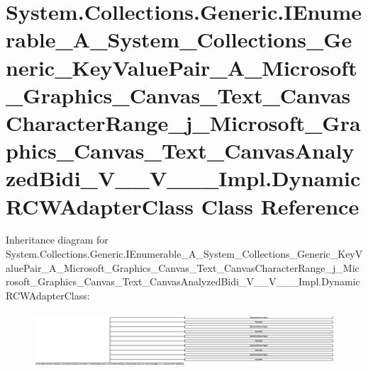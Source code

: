 \hypertarget{class_system_1_1_collections_1_1_generic_1_1_i_enumerable___a___system___collections___generic__0604c343bfe8698948e2ec05bb9ed977}{}\section{System.\+Collections.\+Generic.\+I\+Enumerable\+\_\+\+A\+\_\+\+System\+\_\+\+Collections\+\_\+\+Generic\+\_\+\+Key\+Value\+Pair\+\_\+\+A\+\_\+\+Microsoft\+\_\+\+Graphics\+\_\+\+Canvas\+\_\+\+Text\+\_\+\+Canvas\+Character\+Range\+\_\+j\+\_\+\+Microsoft\+\_\+\+Graphics\+\_\+\+Canvas\+\_\+\+Text\+\_\+\+Canvas\+Analyzed\+Bidi\+\_\+\+V\+\_\+\+\_\+\+V\+\_\+\+\_\+\+\_\+\+Impl.\+Dynamic\+R\+C\+W\+Adapter\+Class Class Reference}
\label{class_system_1_1_collections_1_1_generic_1_1_i_enumerable___a___system___collections___generic__0604c343bfe8698948e2ec05bb9ed977}
Inheritance diagram for System.\+Collections.\+Generic.\+I\+Enumerable\+\_\+\+A\+\_\+\+System\+\_\+\+Collections\+\_\+\+Generic\+\_\+\+Key\+Value\+Pair\+\_\+\+A\+\_\+\+Microsoft\+\_\+\+Graphics\+\_\+\+Canvas\+\_\+\+Text\+\_\+\+Canvas\+Character\+Range\+\_\+j\+\_\+\+Microsoft\+\_\+\+Graphics\+\_\+\+Canvas\+\_\+\+Text\+\_\+\+Canvas\+Analyzed\+Bidi\+\_\+\+V\+\_\+\+\_\+\+V\+\_\+\+\_\+\+\_\+\+Impl.\+Dynamic\+R\+C\+W\+Adapter\+Class\+:\begin{figure}[H]
\begin{center}
\leavevmode
\includegraphics[height=2.130014cm]{class_system_1_1_collections_1_1_generic_1_1_i_enumerable___a___system___collections___generic__0604c343bfe8698948e2ec05bb9ed977}
\end{center}
\end{figure}
